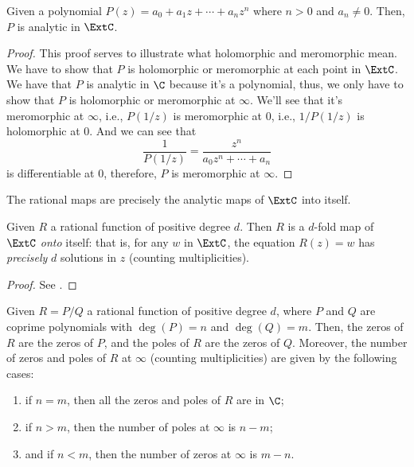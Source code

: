 \begin{proposition}
    Given a polynomial $P(z) = a_0 + a_1 z + \cdots + a_n z^n$ where $n > 0$ and
    $a_n \neq 0$. Then, $P$ is analytic in $\ExtC$.
\end{proposition}
\begin{proof}
    This proof serves to illustrate what holomorphic and meromorphic mean. We
    have to show that $P$ is holomorphic or meromorphic at each point in
    $\ExtC$. We have that $P$ is analytic in $\C$ because it's a polynomial,
    thus, we only have to show that $P$ is holomorphic or meromorphic at
    $\infty$. We'll see that it's meromorphic at $\infty$, i.e., $P(1/z)$ is
    meromorphic at $0$, i.e., $1/P(1/z)$ is holomorphic at $0$. And we can see
    that
    \[
        \frac{1}{P(1/z)} = \frac{z^n}{a_0 z^n + \cdots + a_n}
    \]
    is differentiable at $0$, therefore, $P$ is meromorphic at $\infty$.
\end{proof}

\begin{theorem}
    The rational maps are precisely the analytic maps of $\ExtC$ into itself.
\end{theorem}

\begin{theorem}
    \label{thm:rational_map_are_dfold_maps}
    Given $R$ a rational function of positive degree $d$. Then $R$ is a $d$-fold
    map of $\ExtC$ \emph{onto} itself: that is, for any $w$ in $\ExtC$, the
    equation $R(z) = w$ has \emph{precisely} $d$ solutions in $z$ (counting
    multiplicities).
\end{theorem}
\begin{proof}
    See \cite[31-32]{Beardon1991}.
\end{proof}

\begin{remark}
    Given $R=P/Q$ a rational function of positive degree $d$, where $P$ and $Q$
    are coprime polynomials with $\deg(P) = n$ and $\deg(Q) = m$. Then, the
    zeros of $R$ are the zeros of $P$, and the poles of $R$ are the zeros of
    $Q$. Moreover, the number of zeros and poles of $R$ at $\infty$ (counting
    multiplicities) are given by the following cases:
    \begin{enumerate}
        \item if $n = m$, then all the zeros and poles of $R$ are in $\C$;
        \item if $n > m$, then the number of poles at $\infty$ is $n-m$;
        \item and if $n < m$, then the number of zeros at $\infty$ is $m-n$.
    \end{enumerate}
\end{remark}


